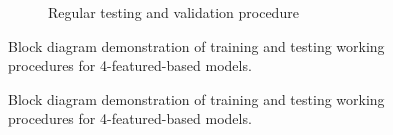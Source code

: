 {\begin{figure}[htbp]
\begin{subfigure}[b]{0.85\textwidth}
            \caption{Regular testing and validation procedure}
            \label{subfig:testing}
        \end{subfigure}
        \caption{Block diagram demonstration of training and testing working procedures for 4-featured-based models.}
        \label{fig:training_testing}
    \end{figure}
} {
    \begin{figure}[!t]
        \centering
        \hfill
        \caption{Block diagram demonstration of training and testing working procedures for 4-featured-based models.}
        \label{fig:training_testing}
    \end{figure}
}

